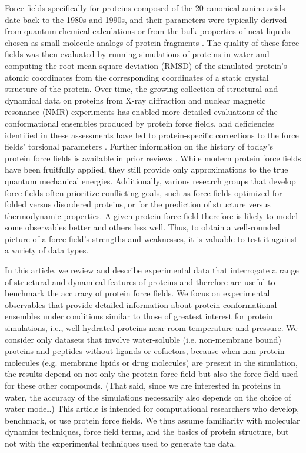 \documentclass[9pt,review]{livecoms}
\begin{document}
Force fields specifically for proteins composed of the 20 canonical amino acids date back to the 1980s and 1990s, and their parameters were typically derived from quantum chemical calculations or from the bulk properties of neat liquids chosen as small molecule analogs of protein fragments \cite{jorgensen_opls_1988,cornell_second_1995,mackerell_all-atom_1998}.
The quality of these force fields was then evaluated by running simulations of proteins in water and computing the root mean square deviation (RMSD) of the simulated protein’s atomic coordinates from the corresponding coordinates of a static crystal structure of the protein.
Over time, the growing collection of structural and dynamical data on proteins from X-ray diffraction and nuclear magnetic resonance (NMR) experiments has enabled more detailed evaluations of the conformational ensembles produced by protein force fields, and deficiencies identified in these assessments have led to protein-specific corrections to the force fields’ torsional parameters \cite{lindorff-larsen_improved_2010,best_optimization_2012,mackerell_jr_extending_2004,Hornak:2006:Proteins,Maier:2015:J.Chem.TheoryComput.,diem_hamiltonian_2020,tian_ff19sb_2020}.
Further information on the history of today’s protein force fields is available in prior reviews \cite{lifson_recent_1973,ponder_force_2003,guvench_comparison_2008,zhu_recent_2012,dauber-osguthorpe_biomolecular_2019}.
While modern protein force fields have been fruitfully applied, they still provide only approximations to the true quantum mechanical energies.
Additionally, various research groups that develop force fields often prioritize conflicting goals, such as force fields optimized for folded versus disordered proteins, or for the prediction of structure versus thermodynamic properties.
A given protein force field therefore is likely to model some observables better and others less well.
Thus, to obtain a well-rounded picture of a force field’s strengths and weaknesses, it is valuable to test it against a variety of data types. 

In this article, we review and describe experimental data that interrogate a range of structural and dynamical features of proteins and therefore are useful to benchmark the accuracy of protein force fields.
We focus on experimental observables that provide detailed information about protein conformational ensembles under conditions similar to those of greatest interest for protein simulations, i.e., well-hydrated proteins near room temperature and pressure.
We consider only datasets that involve water-soluble (i.e. non-membrane bound) proteins and peptides without ligands or cofactors, because when non-protein molecules (e.g. membrane lipids or drug molecules) are present in the simulation, the results depend on not only the protein force field but also the force field used for these other compounds.
(That said, since we are interested in proteins in water, the accuracy of the simulations necessarily also depends on the choice of water model.)
This article is intended for computational researchers who develop, benchmark, or use protein force fields.
We thus assume familiarity with molecular dynamics techniques, force field terms, and the basics of protein structure, but not with the experimental techniques used to generate the data.
\end{document}
